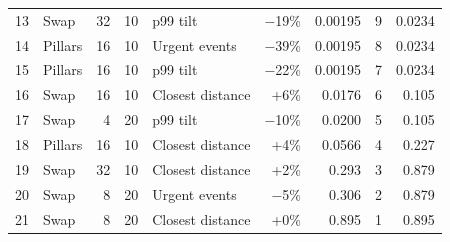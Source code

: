 \documentclass[pdflatex,sn-mathphys-num]{sn-jnl}
\begin{document}
\begin{appendices}
\begin{table}[!htbp]
\begin{tabular}{@{}rlrrlrrrr@{}}
    13 & Swap & 32 & 10 & p99 tilt & $-$19\% & 0.00195 & 9 & 0.0234 \\
    14 & Pillars & 16 & 10 & Urgent events & $-$39\% & 0.00195 & 8 & 0.0234 \\
    15 & Pillars & 16 & 10 & p99 tilt & $-$22\% & 0.00195 & 7 & 0.0234 \\
    16 & Swap & 16 & 10 & Closest distance & +6\% & 0.0176 & 6 & 0.105 \\
    17 & Swap & 4 & 20 & p99 tilt & $-$10\% & 0.0200 & 5 & 0.105 \\
    18 & Pillars & 16 & 10 & Closest distance & +4\% & 0.0566 & 4 & 0.227 \\
    19 & Swap & 32 & 10 & Closest distance & +2\% & 0.293 & 3 & 0.879 \\
    20 & Swap & 8 & 20 & Urgent events & $-$5\% & 0.306 & 2 & 0.879 \\
    21 & Swap & 8 & 20 & Closest distance & +0\% & 0.895 & 1 & 0.895 \\
    \bottomrule
  \end{tabular}
\end{table}

\end{appendices}

\clearpage

\end{document}

